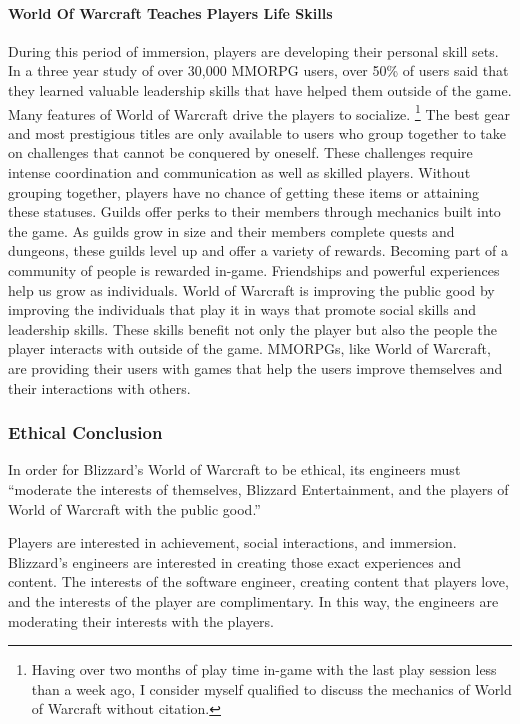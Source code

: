\documentclass[11pt]{article}
\begin{document}
\begin{multicols}{2}
\paragraph{World Of Warcraft Teaches Players Life Skills\\}
During this period of immersion, players are developing their personal skill sets. In a three year study of over 30,000 MMORPG users, over 50\% of users said that they learned valuable leadership skills that have helped them outside of the game. \cite{MotivationsAndDerviedExperiences}
Many features of World of Warcraft drive the players to socialize. \footnote{Having over two months of play time in-game with the last play session less than a week ago, I consider myself qualified to discuss the mechanics of World of Warcraft without citation.} The best gear and most prestigious titles are only available to users who group together to take on challenges that cannot be conquered by oneself. These challenges require intense coordination and communication as well as skilled players. Without grouping together, players have no chance of getting these items or attaining these statuses.
Guilds offer perks to their members through mechanics built into the game. As guilds grow in size and their members complete quests and dungeons, these guilds level up and offer a variety of rewards. Becoming part of a community of people is rewarded in-game.
\newline
\newline
Friendships and powerful experiences help us grow as individuals. World of Warcraft is improving the public good by improving the individuals that play it in ways that promote social skills and leadership skills. These skills benefit not only the player but also the people the player interacts with outside of the game. MMORPGs, like World of Warcraft, are providing their users with games that help the users improve themselves and their interactions with others.

\subsubsection{Ethical Conclusion}
In order for Blizzard's World of Warcraft to be ethical, its engineers must ``moderate the interests of themselves, Blizzard Entertainment, and the players of World of Warcraft with the public good.''

Players are interested in achievement, social interactions, and immersion. Blizzard's engineers are interested in creating those exact experiences and content. The interests of the software engineer, creating content that players love, and the interests of the player are complimentary. In this way, the engineers are moderating their interests with the players.


\end{multicols}
\end{document}
